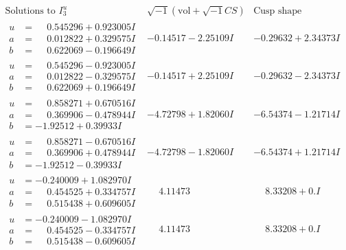 \documentclass[1p]{elsarticle_modified}
\theoremstyle{definition}
\newcommand{\I}{\sqrt{-1}}
\begin{document}
$$\begin{array}{c|c|c}  
\text{Solutions to }I^u_{3}& \I (\text{vol} + \sqrt{-1}CS) & \text{Cusp shape}\\
 \hline 
\begin{aligned}
u &= \phantom{-}0.545296 + 0.923005 I \\
a &= \phantom{-}0.012822 + 0.329575 I \\
b &= \phantom{-}0.622069 - 0.196649 I\end{aligned}
 & -0.14517 - 2.25109 I & -0.29632 + 2.34373 I \\ \hline\begin{aligned}
u &= \phantom{-}0.545296 - 0.923005 I \\
a &= \phantom{-}0.012822 - 0.329575 I \\
b &= \phantom{-}0.622069 + 0.196649 I\end{aligned}
 & -0.14517 + 2.25109 I & -0.29632 - 2.34373 I \\ \hline\begin{aligned}
u &= \phantom{-}0.858271 + 0.670516 I \\
a &= \phantom{-}0.369906 - 0.478944 I \\
b &= -1.92512 + 0.39933 I\end{aligned}
 & -4.72798 + 1.82060 I & -6.54374 - 1.21714 I \\ \hline\begin{aligned}
u &= \phantom{-}0.858271 - 0.670516 I \\
a &= \phantom{-}0.369906 + 0.478944 I \\
b &= -1.92512 - 0.39933 I\end{aligned}
 & -4.72798 - 1.82060 I & -6.54374 + 1.21714 I \\ \hline\begin{aligned}
u &= -0.240009 + 1.082970 I \\
a &= \phantom{-}0.454525 + 0.334757 I \\
b &= \phantom{-}0.515438 + 0.609605 I\end{aligned}
 & \phantom{-}4.11473\phantom{ +0.000000I} & \phantom{-}8.33208 + 0. I\phantom{ +0.000000I} \\ \hline\begin{aligned}
u &= -0.240009 - 1.082970 I \\
a &= \phantom{-}0.454525 - 0.334757 I \\
b &= \phantom{-}0.515438 - 0.609605 I\end{aligned}
 & \phantom{-}4.11473\phantom{ +0.000000I} & \phantom{-}8.33208 + 0. I\phantom{ +0.000000I} \\ \hline\begin{aligned}

\end{aligned}
\end{array}$$
\end{document}
